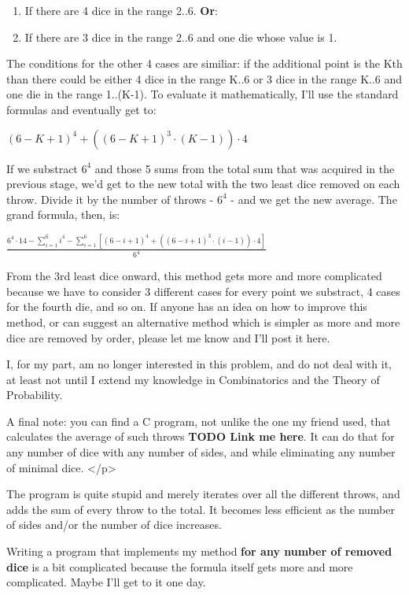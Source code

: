 \documentclass[a4paper]{article}
\begin{document}
\begin{enumerate}
\item If there are 4 dice in the range 2..6. {\bf Or}:
\item If there are 3 dice in the range 2..6 and one die whose value is 1.
\end{enumerate}

The conditions for the other 4 cases are similiar: if the additional point
is the Kth than there could be either 4 dice in the range K..6 or 3 dice in
the range K..6 and one die in the range 1..(K-1). To evaluate it
mathematically, I'll use the standard formulas and eventually get to:

$\left(6-K+1\right)^4  +  \left( \left(6-K+1\right)^3 \cdot \left(K-1\right) \right) \cdot 4$


If we substract $6^4$ and those 5 sums from the total sum that was acquired in 
the previous stage, we'd get to the new total with the two least dice
removed on each throw. Divide it by the number of throws - $6^4$ - and we get
the new average. The grand formula, then, is:

$ \frac{
    6^4\cdot14-\sum\limits_{i=1}^{6}\left.i^4\right. - 
    \sum\limits_{i=1}^{6}\left[\left(6-i+1\right)^4+\left(\left(6-i+1\right)^3 
    \cdot \left(i-1\right)\right) \cdot 4 \right]
}{6^4}$

From the 3rd least dice onward, this method gets more and more complicated
because we have to consider 3 different cases for every point we
substract, 4 cases for the fourth die, and so on. If anyone has an idea
on how to improve this method, or can suggest an alternative method
which is simpler as more and more dice are removed by order, please let
me know and I'll post it here. 

I, for my part, am no longer interested in this problem, and do not deal
with it, at least not until I extend my knowledge in Combinatorics and the
Theory of Probability.

A final note: you can find a C program, not unlike the one my friend used,
that calculates the average of such throws 
{\bf TODO Link me here}. It can do that for any number of
dice with any number of sides, and while eliminating any number of minimal
dice. 
</p>

The program is quite stupid and merely iterates over all the
different throws, and adds the sum of every throw to the total. It
becomes less efficient as the number of sides and/or the number of dice
increases.

Writing a program that implements my method {\bf for any number of removed
dice} is a bit complicated because the formula itself gets more and more
complicated. Maybe I'll get to it one day.
\end{document}
